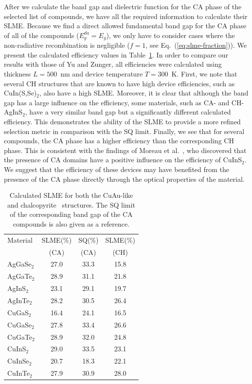 \begin{refsection}
After we calculate the band gap and dielectric function for the CA phase of 
the selected list of compounds, we have all the required information to 
calculate their SLME. Because we find a direct allowed fundamental band gap 
for the CA phase of all of the compounds ($E_g^{da}=E_g$), we only have to 
consider cases where the non-radiative recombination is negligible ($f = 1$, 
see Eq.~(\ref{eq:slme-fraction})). We present the calculated efficiency values 
in Table~\ref{tab:slme-SLME}. In order to compare our results with those of Yu 
and Zunger, all efficiencies were calculated using thickness $L = 
500$~\si{\nano\meter} and device temperature \mbox{$T = 300$~\si{\kelvin}}. 
First, we note that several CH structures that are known to have high device 
efficiencies, such as CuIn(S,Se)$_{2}$, also have a high SLME. Moreover, it is 
clear that although the band gap has a large influence on the efficiency, some 
materials, such as CA- and \mbox{CH-AgInS$_2$}, have a very similar band gap 
but a significantly different calculated efficiency. This demonstrates the 
ability of the SLME to provide a more refined selection metric in comparison 
with the SQ limit. Finally, we see that for several compounds, the CA phase 
has a higher efficiency than the corresponding CH phase. This is consistent 
with the findings of Moreau et al.~\cite{Moreau2015}, who discovered that the 
presence of CA domains have a positive influence on the efficiency of 
CuInS$_2$. We suggest that the efficiency of these devices may have benefited 
from the presence of the CA phase directly through the optical properties of 
the material. 
 
\begin{table}[htbp] 
\renewcommand{\arraystretch}{1.3} 
\centering 
\caption{Calculated SLME for both the \mbox{CuAu-like} and 
chalcopyrite~\cite{Yu2012} structures. The SQ limit of the corresponding band 
gap of the CA compounds is also given as a reference.} 
\label{tab:slme-SLME} 
\begin{tabular}{l@{\hskip 2em}c@{\hskip 1em}c@{\hskip 1em}c} 
\hline 
Material & SLME(\%) & SQ(\%) & SLME(\%)\\ 
		 &  (CA)	&  (CA) &  (CH)	 \\\hline 
AgGaSe$_2$ & 27.0 & 33.3 & 15.8 \\ 
AgGaTe$_2$ & 28.9 & 31.1 & 21.8 \\ 
AgInS$_2$  & 23.1 & 29.1 & 19.7 \\ 
AgInTe$_2$ & 28.2 & 30.5 & 26.4 \\ 
CuGaS$_2$  & 16.4 & 24.1 & 16.5 \\ 
CuGaSe$_2$ & 27.8 & 33.4 & 26.6 \\ 
CuGaTe$_2$ & 28.9 & 32.0 & 24.8 \\ 
CuInS$_2$  & 29.0 & 33.5 & 23.1 \\ 
CuInSe$_2$ & 20.7 & 18.3 & 22.1 \\ 
CuInTe$_2$ & 27.9 & 30.9 & 28.0 \\ \hline 
\end{tabular} 
\end{table} 
 

\end{refsection}
